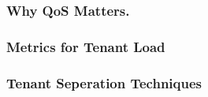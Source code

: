 
\subsubsection{Why QoS Matters.}

\subsubsection{Metrics for Tenant Load}

\subsubsection{Tenant Seperation Techniques}
